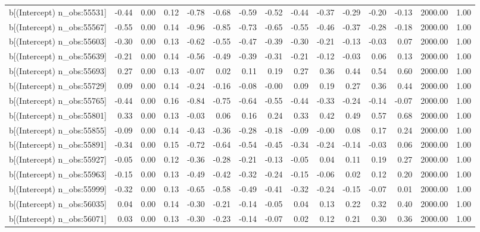 \begin{table}[ht]
\begin{tabular}{rrrrrrrrrrrrrrr}
  b[(Intercept) n\_obs:55531] & -0.44 & 0.00 & 0.12 & -0.78 & -0.68 & -0.59 & -0.52 & -0.44 & -0.37 & -0.29 & -0.20 & -0.13 & 2000.00 & 1.00 \\ 
  b[(Intercept) n\_obs:55567] & -0.55 & 0.00 & 0.14 & -0.96 & -0.85 & -0.73 & -0.65 & -0.55 & -0.46 & -0.37 & -0.28 & -0.18 & 2000.00 & 1.00 \\ 
  b[(Intercept) n\_obs:55603] & -0.30 & 0.00 & 0.13 & -0.62 & -0.55 & -0.47 & -0.39 & -0.30 & -0.21 & -0.13 & -0.03 & 0.07 & 2000.00 & 1.00 \\ 
  b[(Intercept) n\_obs:55639] & -0.21 & 0.00 & 0.14 & -0.56 & -0.49 & -0.39 & -0.31 & -0.21 & -0.12 & -0.03 & 0.06 & 0.13 & 2000.00 & 1.00 \\ 
  b[(Intercept) n\_obs:55693] & 0.27 & 0.00 & 0.13 & -0.07 & 0.02 & 0.11 & 0.19 & 0.27 & 0.36 & 0.44 & 0.54 & 0.60 & 2000.00 & 1.00 \\ 
  b[(Intercept) n\_obs:55729] & 0.09 & 0.00 & 0.14 & -0.24 & -0.16 & -0.08 & -0.00 & 0.09 & 0.19 & 0.27 & 0.36 & 0.44 & 2000.00 & 1.00 \\ 
  b[(Intercept) n\_obs:55765] & -0.44 & 0.00 & 0.16 & -0.84 & -0.75 & -0.64 & -0.55 & -0.44 & -0.33 & -0.24 & -0.14 & -0.07 & 2000.00 & 1.00 \\ 
  b[(Intercept) n\_obs:55801] & 0.33 & 0.00 & 0.13 & -0.03 & 0.06 & 0.16 & 0.24 & 0.33 & 0.42 & 0.49 & 0.57 & 0.68 & 2000.00 & 1.00 \\ 
  b[(Intercept) n\_obs:55855] & -0.09 & 0.00 & 0.14 & -0.43 & -0.36 & -0.28 & -0.18 & -0.09 & -0.00 & 0.08 & 0.17 & 0.24 & 2000.00 & 1.00 \\ 
  b[(Intercept) n\_obs:55891] & -0.34 & 0.00 & 0.15 & -0.72 & -0.64 & -0.54 & -0.45 & -0.34 & -0.24 & -0.14 & -0.03 & 0.06 & 2000.00 & 1.00 \\ 
  b[(Intercept) n\_obs:55927] & -0.05 & 0.00 & 0.12 & -0.36 & -0.28 & -0.21 & -0.13 & -0.05 & 0.04 & 0.11 & 0.19 & 0.27 & 2000.00 & 1.00 \\ 
  b[(Intercept) n\_obs:55963] & -0.15 & 0.00 & 0.13 & -0.49 & -0.42 & -0.32 & -0.24 & -0.15 & -0.06 & 0.02 & 0.12 & 0.20 & 2000.00 & 1.00 \\ 
  b[(Intercept) n\_obs:55999] & -0.32 & 0.00 & 0.13 & -0.65 & -0.58 & -0.49 & -0.41 & -0.32 & -0.24 & -0.15 & -0.07 & 0.01 & 2000.00 & 1.00 \\ 
  b[(Intercept) n\_obs:56035] & 0.04 & 0.00 & 0.14 & -0.30 & -0.21 & -0.14 & -0.05 & 0.04 & 0.13 & 0.22 & 0.32 & 0.40 & 2000.00 & 1.00 \\ 
  b[(Intercept) n\_obs:56071] & 0.03 & 0.00 & 0.13 & -0.30 & -0.23 & -0.14 & -0.07 & 0.02 & 0.12 & 0.21 & 0.30 & 0.36 & 2000.00 & 1.00 \\ 

\end{tabular}
\end{table}
